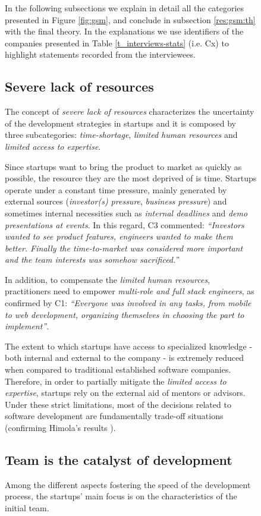 \documentclass[12pt,journal,compsoc]{../sty/IEEEtran}
\begin{document}
\begin{table}[!t]
\begin{figure}[!t]
In the following subsections we explain in detail all the categories presented
in Figure \ref{fig:gsm}, and conclude in subsection \ref{res:gsm:th} with the
final theory. In the explanations we use identifiers of the companies presented
in Table \ref{t_interviews-stats} (i.e. Cx) to highlight statements recorded
from the interviewees.

\subsection{Severe lack of resources} \label{res:gsm:cat7} The concept of
\textit{severe lack of resources} characterizes the uncertainty  of the
development strategies in startups and it is composed by three  subcategories:
\textit{time-shortage}, \textit{limited human resources} and  \textit{limited
access to expertise}.


Since startups want to bring the product to market as quickly as possible, the
resource they are the most deprived of is time. Startups operate under a
constant time pressure, mainly generated by external sources
(\textit{investor(s) pressure}, \textit{business pressure}) and sometimes
internal necessities such as \textit{internal deadlines} and \textit{demo
presentations at events}. In this regard, C3 commented: \textit{``Investors
wanted to see product features, engineers wanted to make them better. Finally
the time-to-market was considered more important and the team interests was
somehow sacrificed.''}

In addition, to compensate the \textit{limited human resources},  practitioners
need to empower \textit{multi-role and full stack engineers}, as confirmed by
C1: \textit{``Everyone was involved in any tasks, from mobile to web
development, organizing themselves in choosing the part to implement''}.

The extent to which startups have access to specialized knowledge - both
internal and external to the company - is extremely reduced when compared to
traditional established software companies. Therefore, in order to partially
mitigate the \textit{limited access to expertise}, startups rely on the external
aid of mentors or advisors. Under these strict limitations, most of the
decisions related to software development are fundamentally trade-off
situations (confirming Himola's results \cite{Hilmola2003}).
\subsection{Team is the catalyst of development} \label{res:gsm:cat4} Among the
different aspects fostering the speed of the development process, the  startups'
main focus is on the characteristics of the initial team.


\end{figure}
\end{table}
\end{document}
